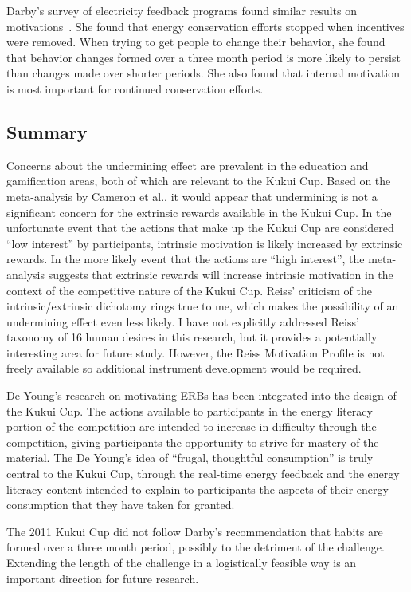 Darby's survey of electricity feedback programs found similar results on motivations~\cite{darby-review-2006}. She found that energy conservation efforts stopped when incentives were removed. When trying to get people to change their behavior, she found that behavior changes formed over a three month period is more likely to persist than changes made over shorter periods. She also found that internal motivation is most important for continued conservation efforts.


\subsection{Summary}

Concerns about the undermining effect are prevalent in the education and gamification areas, both of which are relevant to the Kukui Cup. Based on the meta-analysis by Cameron et al., it would appear that undermining is not a significant concern for the extrinsic rewards available in the Kukui Cup. In the unfortunate event that the actions that make up the Kukui Cup are considered ``low interest'' by participants, intrinsic motivation is likely increased by extrinsic rewards. In the more likely event that the actions are ``high interest'', the meta-analysis suggests that extrinsic rewards will increase intrinsic motivation in the context of the competitive nature of the Kukui Cup. Reiss' criticism of the intrinsic/extrinsic dichotomy rings true to me, which makes the possibility of an undermining effect even less likely. I have not explicitly addressed Reiss' taxonomy of 16 human desires in this research, but it provides a potentially interesting area for future study. However, the Reiss Motivation Profile is not freely available so additional instrument development would be required.

De Young's research on motivating ERBs has been integrated into the design of the Kukui Cup. The actions available to participants in the energy literacy portion of the competition are intended to increase in difficulty through the competition, giving participants the opportunity to strive for mastery of the material. The De Young's idea of ``frugal, thoughtful consumption'' is truly central to the Kukui Cup, through the real-time energy feedback and the energy literacy content intended to explain to participants the aspects of their energy consumption that they have taken for granted.

The 2011 Kukui Cup did not follow Darby's recommendation that habits are formed over a three month period, possibly to the detriment of the challenge. Extending the length of the challenge in a logistically feasible way is an important direction for future research.


